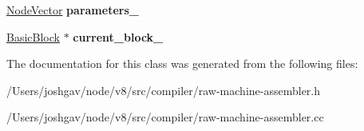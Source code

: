 \begin{DoxyCompactItemize}
\item 
\hyperlink{classv8_1_1internal_1_1_zone_vector}{Node\+Vector} {\bfseries parameters\+\_\+}\hypertarget{classv8_1_1internal_1_1compiler_1_1_raw_machine_assembler_a37999dcf79244a2646728bb6f2306c20}{}\label{classv8_1_1internal_1_1compiler_1_1_raw_machine_assembler_a37999dcf79244a2646728bb6f2306c20}

\item 
\hyperlink{classv8_1_1internal_1_1compiler_1_1_basic_block}{Basic\+Block} $\ast$ {\bfseries current\+\_\+block\+\_\+}\hypertarget{classv8_1_1internal_1_1compiler_1_1_raw_machine_assembler_a5d09239c0c1d1a9c33e2459133b17226}{}\label{classv8_1_1internal_1_1compiler_1_1_raw_machine_assembler_a5d09239c0c1d1a9c33e2459133b17226}

\end{DoxyCompactItemize}


The documentation for this class was generated from the following files\+:\begin{DoxyCompactItemize}
\item 
/\+Users/joshgav/node/v8/src/compiler/raw-\/machine-\/assembler.\+h\item 
/\+Users/joshgav/node/v8/src/compiler/raw-\/machine-\/assembler.\+cc\end{DoxyCompactItemize}
